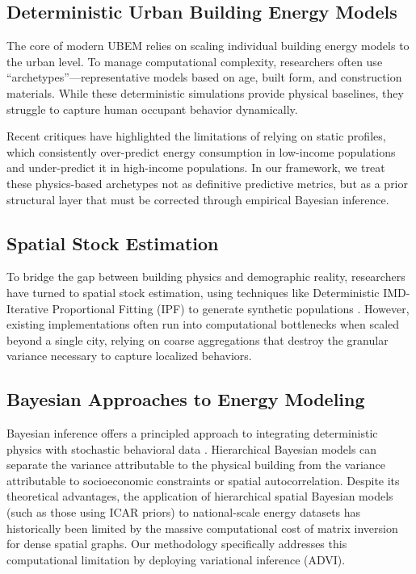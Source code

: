\documentclass[11pt, a4paper, twocolumn]{article}
\begin{document}
\subsection{Deterministic Urban Building Energy Models}\label{deterministic-urban-building-energy-models}

The core of modern UBEM relies on scaling individual building energy models to the urban level. To manage computational complexity, researchers often use ``archetypes''---representative models based on age, built form, and construction materials. While these deterministic simulations provide physical baselines, they struggle to capture human occupant behavior dynamically.

Recent critiques \cite{Ward2019} have highlighted the limitations of relying on static profiles, which consistently over-predict energy consumption in low-income populations and under-predict it in high-income populations. In our framework, we treat these physics-based archetypes not as definitive predictive metrics, but as a prior structural layer that must be corrected through empirical Bayesian inference.

\subsection{Spatial Stock Estimation}\label{spatial-stock-estimation}

To bridge the gap between building physics and demographic reality, researchers have turned to spatial stock estimation, using techniques like Deterministic IMD-Iterative Proportional Fitting (IPF) to generate synthetic populations \cite{NetoBradley2021}. However, existing implementations often run into computational bottlenecks when scaled beyond a single city, relying on coarse aggregations that destroy the granular variance necessary to capture localized behaviors. 

\subsection{Bayesian Approaches to Energy Modeling}\label{bayesian-approaches-to-energy-modeling}

Bayesian inference offers a principled approach to integrating deterministic physics with stochastic behavioral data \cite{Booth2013, petrou2024bayesian, Wang2021}. Hierarchical Bayesian models can separate the variance attributable to the physical building from the variance attributable to socioeconomic constraints or spatial autocorrelation. Despite its theoretical advantages, the application of hierarchical spatial Bayesian models (such as those using ICAR priors) to national-scale energy datasets has historically been limited by the massive computational cost of matrix inversion for dense spatial graphs. Our methodology specifically addresses this computational limitation by deploying variational inference (ADVI).
\end{document}
